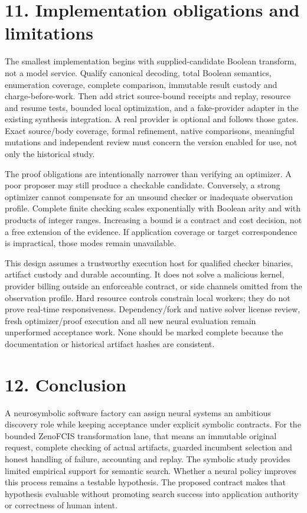 \documentclass[11pt]{article}
\begin{document}
\section{11. Implementation obligations and limitations}

The smallest implementation begins with supplied-candidate Boolean transform, not a model service. Qualify canonical decoding, total Boolean semantics, enumeration coverage, complete comparison, immutable result custody and charge-before-work. Then add strict source-bound receipts and replay, resource and resume tests, bounded local optimization, and a fake-provider adapter in the existing synthesis integration. A real provider is optional and follows those gates. Exact source/body coverage, formal refinement, native comparisons, meaningful mutations and independent review must concern the version enabled for use, not only the historical study.

The proof obligations are intentionally narrower than verifying an optimizer. A poor proposer may still produce a checkable candidate. Conversely, a strong optimizer cannot compensate for an unsound checker or inadequate observation profile. Complete finite checking scales exponentially with Boolean arity and with products of integer ranges. Increasing a bound is a contract and cost decision, not a free extension of the evidence. If application coverage or target correspondence is impractical, those modes remain unavailable.

This design assumes a trustworthy execution host for qualified checker binaries, artifact custody and durable accounting. It does not solve a malicious kernel, provider billing outside an enforceable contract, or side channels omitted from the observation profile. Hard resource controls constrain local workers; they do not prove real-time responsiveness. Dependency/fork and native solver license review, fresh optimizer/proof execution and all new neural evaluation remain unperformed acceptance work. None should be marked complete because the documentation or historical artifact hashes are consistent.

\section{12. Conclusion}

A neurosymbolic software factory can assign neural systems an ambitious discovery role while keeping acceptance under explicit symbolic contracts. For the bounded ZenoFCIS transformation lane, that means an immutable original request, complete checking of actual artifacts, guarded incumbent selection and honest handling of failure, accounting and replay. The symbolic study provides limited empirical support for semantic search. Whether a neural policy improves this process remains a testable hypothesis. The proposed contract makes that hypothesis evaluable without promoting search success into application authority or correctness of human intent.
\end{document}
